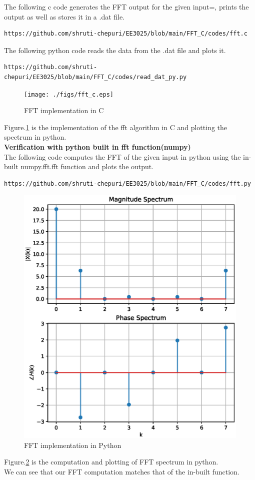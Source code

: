 \documentclass[journal,12pt,twocolumn]{IEEEtran}
\begin{document}
The following c code generates the FFT output for the given input={}, prints the output as well as stores it in a .dat file.
\begin{lstlisting}
https://github.com/shruti-chepuri/EE3025/blob/main/FFT_C/codes/fft.c
\end{lstlisting}
The following python code reads the data from the .dat file and plots it.
\begin{lstlisting}
https://github.com/shruti-chepuri/EE3025/blob/main/FFT_C/codes/read_dat_py.py
\end{lstlisting} 
\begin{figure}
    \centering
    \texttt{[image: ./figs/fft\_c.eps]}
    \caption{FFT implementation in C}
    \label{fig:fft_c}
\end{figure}
Figure.\ref{fig:fft_c} is the implementation of the fft algorithm in C and plotting the spectrum in python.\\

\textbf{Verification with python built in fft function(numpy)} \\

The following code computes the FFT of the given input in python using the in-built numpy.fft.fft function and plots the output.
\begin{lstlisting}
https://github.com/shruti-chepuri/EE3025/blob/main/FFT_C/codes/fft.py
\end{lstlisting}
\begin{figure}
    \centering
    \includegraphics[width=\columnwidth]{./figs/fft_py.eps}
    \caption{FFT implementation in Python}
    \label{fig:fft_py}
\end{figure}
Figure.\ref{fig:fft_py} is the computation and plotting of FFT spectrum in python.\\
We can see that our FFT computation matches that of the in-built function. 
\end{document}
